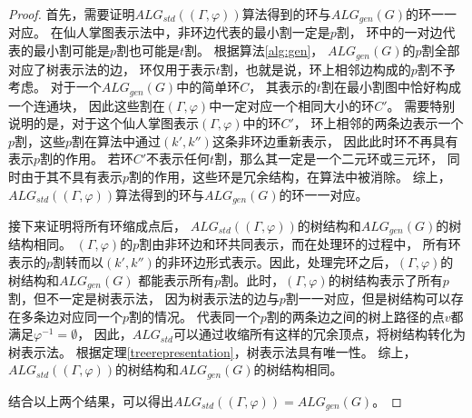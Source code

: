 \begin{proof}
  首先，需要证明$ALG_{std}((\Gamma,\varphi))$算法得到的环与$ALG_{gen}(G)$的环一一对应。
  在仙人掌图表示法中，非环边代表的最小割一定是$p$割，
  环中的一对边代表的最小割可能是$p$割也可能是$t$割。
  根据算法\ref{alg:gen}，
  $ALG_{gen}(G)$的$p$割全部对应了树表示法的边，
  环仅用于表示$t$割，也就是说，环上相邻边构成的$p$割不予考虑。
  对于一个$ALG_{gen}(G)$中的简单环$C$，
  其表示的$t$割在最小割图中恰好构成一个连通块，
  因此这些割在$(\Gamma,\varphi)$中一定对应一个相同大小的环$C'$。
  需要特别说明的是，对于这个仙人掌图表示$(\Gamma,\varphi)$中的环$C'$，
  环上相邻的两条边表示一个$p$割，这些$p$割在算法中通过$(k',k'')$这条非环边重新表示，
  因此此时环不再具有表示$p$割的作用。
  若环$C'$不表示任何$t$割，那么其一定是一个二元环或三元环，
  同时由于其不具有表示$p$割的作用，这些环是冗余结构，在算法中被消除。
  综上，$ALG_{std}((\Gamma,\varphi))$算法得到的环与$ALG_{gen}(G)$的环一一对应。

  接下来证明将所有环缩成点后，
  $ALG_{std}((\Gamma,\varphi))$的树结构和$ALG_{gen}(G)$的树结构相同。
  $(\Gamma,\varphi)$的$p$割由非环边和环共同表示，而在处理环的过程中，
  所有环表示的$p$割转而以$(k',k'')$的非环边形式表示。因此，处理完环之后，$(\Gamma,\varphi)$的树结构和$ALG_{gen}(G)$
  都能表示所有$p$割。此时，$(\Gamma,\varphi)$的树结构表示了所有$p$割，但不一定是树表示法，
  因为树表示法的边与$p$割一一对应，但是树结构可以存在多条边对应同一个$p$割的情况。
  代表同一个$p$割的两条边之间的树上路径的点$v$都满足$\varphi^{-1}=\emptyset$，
  因此，$ALG_{std}$可以通过收缩所有这样的冗余顶点，将树结构转化为树表示法。
  根据定理\ref{treerepresentation}，树表示法具有唯一性。
  综上， $ALG_{std}((\Gamma,\varphi))$的树结构和$ALG_{gen}(G)$的树结构相同。

  结合以上两个结果，可以得出$ALG_{std}((\Gamma,\varphi))=ALG_{gen}(G)$。
\end{proof}
